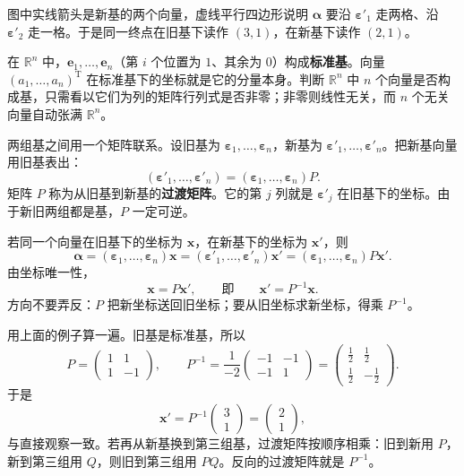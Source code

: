 图中实线箭头是新基的两个向量，虚线平行四边形说明 $\boldsymbol{\alpha}$ 要沿 $\boldsymbol{\varepsilon}'_1$ 走两格、沿 $\boldsymbol{\varepsilon}'_2$ 走一格。于是同一终点在旧基下读作 $(3,1)$，在新基下读作 $(2,1)$。

在 $\mathbb{R}^n$ 中，$\boldsymbol{e}_1,\ldots,\boldsymbol{e}_n$（第 $i$ 个位置为 $1$、其余为 $0$）构成\textbf{标准基}。向量 $(a_1,\ldots,a_n)^{\mathrm T}$ 在标准基下的坐标就是它的分量本身。判断 $\mathbb{R}^n$ 中 $n$ 个向量是否构成基，只需看以它们为列的矩阵行列式是否非零；非零则线性无关，而 $n$ 个无关向量自动张满 $\mathbb{R}^n$。

两组基之间用一个矩阵联系。设旧基为 $\boldsymbol{\varepsilon}_1,\ldots,\boldsymbol{\varepsilon}_n$，新基为 $\boldsymbol{\varepsilon}'_1,\ldots,\boldsymbol{\varepsilon}'_n$。把新基向量用旧基表出：
\[
(\boldsymbol{\varepsilon}'_1,\ldots,\boldsymbol{\varepsilon}'_n)
=(\boldsymbol{\varepsilon}_1,\ldots,\boldsymbol{\varepsilon}_n)P.
\]
矩阵 $P$ 称为从旧基到新基的\textbf{过渡矩阵}。它的第 $j$ 列就是 $\boldsymbol{\varepsilon}'_j$ 在旧基下的坐标。由于新旧两组都是基，$P$ 一定可逆。

若同一个向量在旧基下的坐标为 $\boldsymbol{x}$，在新基下的坐标为 $\boldsymbol{x}'$，则
\[
\boldsymbol{\alpha}=(\boldsymbol{\varepsilon}_1,\ldots,\boldsymbol{\varepsilon}_n)\boldsymbol{x}
=(\boldsymbol{\varepsilon}'_1,\ldots,\boldsymbol{\varepsilon}'_n)\boldsymbol{x}'
=(\boldsymbol{\varepsilon}_1,\ldots,\boldsymbol{\varepsilon}_n)P\boldsymbol{x}'.
\]
由坐标唯一性，
\[
\boldsymbol{x}=P\boldsymbol{x}',\qquad\text{即}\qquad \boldsymbol{x}'=P^{-1}\boldsymbol{x}.
\]
方向不要弄反：$P$ 把新坐标送回旧坐标；要从旧坐标求新坐标，得乘 $P^{-1}$。

用上面的例子算一遍。旧基是标准基，所以
\[
P=\begin{pmatrix}1&1\\1&-1\end{pmatrix},\qquad
P^{-1}=\frac{1}{-2}\begin{pmatrix}-1&-1\\-1&1\end{pmatrix}
=\begin{pmatrix}\frac12&\frac12\\[2pt]\frac12&-\frac12\end{pmatrix}.
\]
于是
\[
\boldsymbol{x}'=P^{-1}\begin{pmatrix}3\\1\end{pmatrix}
=\begin{pmatrix}2\\1\end{pmatrix},
\]
与直接观察一致。若再从新基换到第三组基，过渡矩阵按顺序相乘：旧到新用 $P$，新到第三组用 $Q$，则旧到第三组用 $PQ$。反向的过渡矩阵就是 $P^{-1}$。

